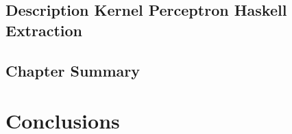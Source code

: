 \documentclass[numbered,pdftex]{ohio-etd}
\begin{document}
\section{Description Kernel Perceptron Haskell Extraction}\label{KPDHaskell}
\section{Chapter Summary}\label{ResultsChapterSummarySection}
\chapter{Conclusions}\label{ConclusionsChapter}




\end{document}
